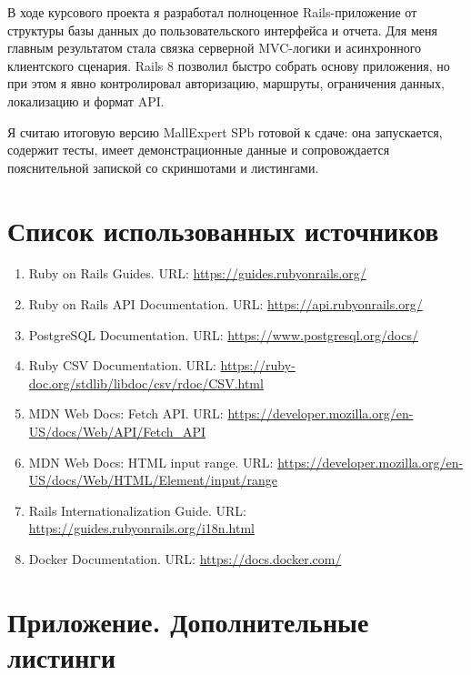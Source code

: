 \documentclass[14pt,a4paper]{extarticle}
\begin{document}
В ходе курсового проекта я разработал полноценное Rails-приложение от структуры базы данных до пользовательского интерфейса и отчета. Для меня главным результатом стала связка серверной MVC-логики и асинхронного клиентского сценария. Rails 8 позволил быстро собрать основу приложения, но при этом я явно контролировал авторизацию, маршруты, ограничения данных, локализацию и формат API.

Я считаю итоговую версию MallExpert SPb готовой к сдаче: она запускается, содержит тесты, имеет демонстрационные данные и сопровождается пояснительной запиской со скриншотами и листингами.

\section{Список использованных источников}

\begin{enumerate}
  \item Ruby on Rails Guides. URL: \url{https://guides.rubyonrails.org/}
  \item Ruby on Rails API Documentation. URL: \url{https://api.rubyonrails.org/}
  \item PostgreSQL Documentation. URL: \url{https://www.postgresql.org/docs/}
  \item Ruby CSV Documentation. URL: \url{https://ruby-doc.org/stdlib/libdoc/csv/rdoc/CSV.html}
  \item MDN Web Docs: Fetch API. URL: \url{https://developer.mozilla.org/en-US/docs/Web/API/Fetch_API}
  \item MDN Web Docs: HTML input range. URL: \url{https://developer.mozilla.org/en-US/docs/Web/HTML/Element/input/range}
  \item Rails Internationalization Guide. URL: \url{https://guides.rubyonrails.org/i18n.html}
  \item Docker Documentation. URL: \url{https://docs.docker.com/}
\end{enumerate}

\appendix
\section{Приложение. Дополнительные листинги}





\end{document}
